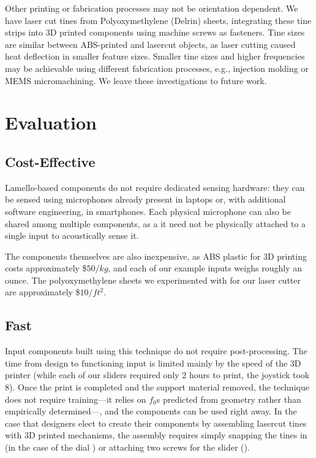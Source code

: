     Other printing or fabrication processes may not be orientation dependent. We have laser cut tines from Polyoxymethylene (Delrin) sheets, integrating these tine strips into 3D printed components using machine screws as fasteners. Tine sizes are similar between ABS-printed and lasercut objects, as laser cutting caused heat deflection in smaller feature sizes. Smaller tine sizes and higher frequencies may be achievable using different fabrication processes, e.g., injection molding or MEMS micromachining. We leave these investigations to future work.
    

\section{Evaluation}

    \subsection{Cost-Effective}
    Lamello-based components do not require dedicated sensing hardware: they can be sensed using microphones already present in laptops or, with additional software engineering, in smartphones. Each physical microphone can also be shared among multiple components, as a it need not be physically attached to a single input to acoustically sense it.
    
    The components themselves are also inexpensive, as ABS plastic for 3D printing costs approximately \$$50/kg$, and each of our example inputs weighs roughly an ounce. The polyoxymethylene sheets we experimented with for our laser cutter are approximately \$$10/ft^2$.
    
    \subsection{Fast}
    Input components built using this technique do not require post-processing. The time from design to functioning input is limited mainly by the speed of the 3D printer (while each of our sliders required only 2 hours to print, the joystick took 8). Once the print is completed and the support material removed, the technique does not require training---it relies on $f_0$s predicted from geometry rather than empirically determined---, and the components can be used right away. In the case that designers elect to create their components by assembling lasercut tines with 3D printed mechanisms, the assembly requires simply snapping the tines in (in the case of the dial ) or attaching two screws for the slider ().
    
